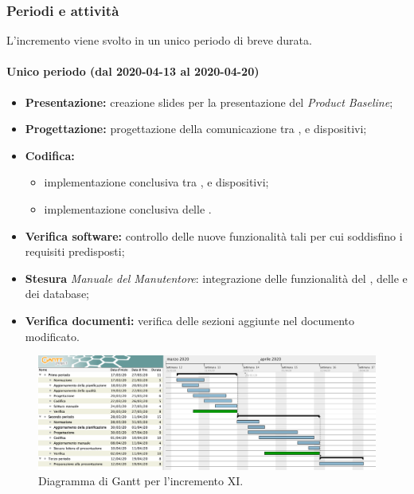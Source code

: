 			\subsubsection{Periodi e attività}
			
				L'incremento viene svolto in un unico periodo di breve durata.
				
				\paragraph{Unico periodo (dal 2020-04-13 al 2020-04-20)}
				
					\begin{itemize}
						\item \textbf{Presentazione:} creazione slides per la presentazione del \textit{Product Baseline};
						\item \textbf{Progettazione:} progettazione della comunicazione tra ,  e dispositivi;
						\item \textbf{Codifica:} 
						\begin{itemize}
							\item implementazione conclusiva  tra ,  e dispositivi; 
							\item implementazione conclusiva delle .
						\end{itemize}
						\item \textbf{Verifica software:} controllo delle nuove funzionalità tali per cui soddisfino i requisiti predisposti;
						\item \textbf{Stesura} \textit{Manuale del Manutentore}: integrazione delle funzionalità del , delle  e dei database;
						\item \textbf{Verifica documenti:} verifica delle sezioni aggiunte nel documento modificato.
					\end{itemize} 			

		\begin{landscape}
          \begin{figure}[H]
            \centering
            \includegraphics[width=\linewidth]{images/ganttDettaglioCodifica} %
            \caption{Diagramma di Gantt per l'incremento XI.}
          \end{figure}		
		\end{landscape}

